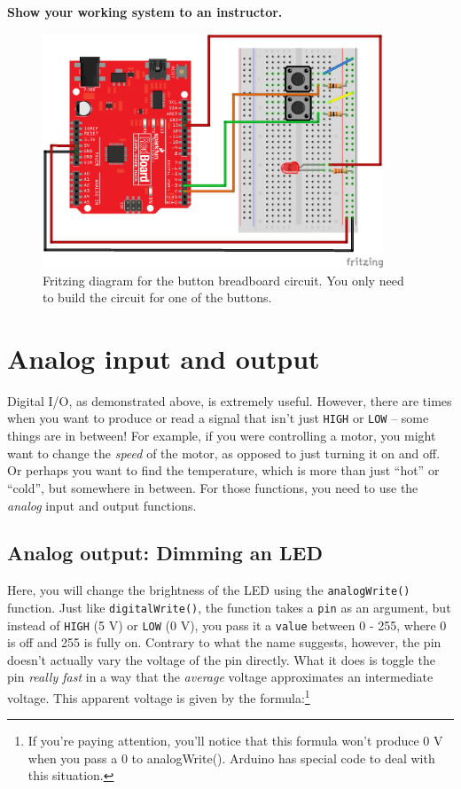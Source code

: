 \documentclass[11pt]{article} %
\begin{document}
{\bf Show your working system to an instructor.}

\begin{figure}[htbp]
\begin{center}
\includegraphics[width=4in]{figures/button_fritz.png}
\caption{Fritzing diagram for the button breadboard circuit. You only need to build the circuit for one of the buttons.}
\label{fig:button}
\end{center}
\end{figure}

\section*{Analog input and output}

Digital I/O, as demonstrated above, is extremely useful. However, there are times when you want to produce or read a signal that isn’t just \verb|HIGH| or \verb|LOW| -- some things are in between! For example, if you were controlling a motor, you might want to change the \emph{speed} of the motor, as opposed to just turning it on and off. Or perhaps you want to find the temperature, which is more than just “hot” or “cold”, but somewhere in between. For those functions, you need to use the \emph{analog} input and output functions.

\subsection*{Analog output: Dimming an LED}

Here, you will change the brightness of the LED using the \verb|analogWrite()| function. Just like \verb|digitalWrite()|, the function takes a \verb|pin| as an argument, but instead of \verb|HIGH| (5 V) or \verb|LOW| (0 V), you pass it a \verb|value| between 0 - 255, where 0 is off and 255 is fully on. Contrary to what the name suggests, however, the pin doesn’t actually vary the voltage of the pin directly. What it does is toggle the pin \emph{really fast} in a way that the \emph{average} voltage approximates an intermediate voltage. This apparent voltage is given by the formula:\footnote{If you're paying attention, you'll notice that this formula won't produce 0 V when you pass a 0 to analogWrite(). Arduino has special code to deal with this situation.}
\end{document}
